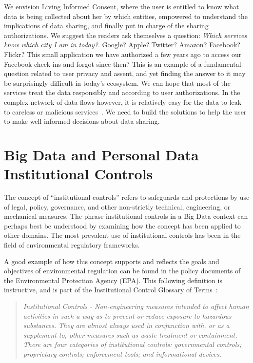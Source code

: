 We envision Living Informed Consent, where the user is entitled to know what data is being collected about her by which entities, empowered to understand the implications of data sharing, and finally put in charge of the sharing authorizations.
We suggest the readers ask themselves a question: \emph{Which services know which city I am in today?}.
Google? Apple? Twitter? Amazon? Facebook? Flickr?
This small application we have authorized a few years ago to access our Facebook check-ins and forgot since then? 
This is an example of a fundamental question related to user privacy and assent, and yet finding the answer to it may be surprisingly difficult in today's ecosystem.
We can hope that most of the services treat the data responsibly and according to user authorizations.
In the complex network of data flows however, it is relatively easy for the data to leak to  careless or malicious services~\cite{biltongirls}.
We need to build the solutions to help the user to make well informed decisions about data sharing.


\section{Big Data and Personal Data Institutional Controls}

The concept of ``institutional controls'' refers to safeguards and protections by use of legal, policy, governance, and other non-strictly technical, engineering, or mechanical measures.
The phrase institutional controls in a Big Data context can perhaps best be understood by examining how the concept has been applied to other domains.
The most prevalent use of institutional controls has been in the field of environmental regulatory frameworks.

A good example of how this concept supports and reflects the goals and objectives of environmental regulation can be found in the policy documents of the Environmental Protection Agency (EPA).
This following definition is instructive, and is part of the Institutional Control Glossary of Terms~\cite{EPA2007}:
\begin{quote}
\emph{
Institutional Controls - Non-engineering measures intended to affect human activities in such a way as to prevent or reduce exposure to hazardous substances. They are almost always used in conjunction with, or as a supplement to, other measures such as waste treatment or containment. There are four categories of institutional controls: governmental controls; proprietary controls; enforcement tools; and informational devices.
}
\end{quote}


